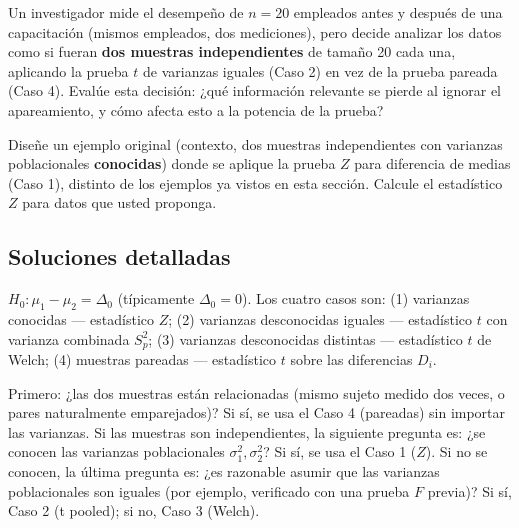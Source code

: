 \begin{problema}
	\label{prob:bf23a02}
	Un investigador mide el desempeño de $n=20$ empleados antes y después de una capacitación (mismos empleados, dos mediciones), pero decide analizar los datos como si fueran \textbf{dos muestras independientes} de tamaño 20 cada una, aplicando la prueba $t$ de varianzas iguales (Caso 2) en vez de la prueba pareada (Caso 4). Evalúe esta decisión: ¿qué información relevante se pierde al ignorar el apareamiento, y cómo afecta esto a la potencia de la prueba?
\end{problema}

\begin{problema}
	\label{prob:7fe0aa3}
	Diseñe un ejemplo original (contexto, dos muestras independientes con varianzas poblacionales \textbf{conocidas}) donde se aplique la prueba $Z$ para diferencia de medias (Caso 1), distinto de los ejemplos ya vistos en esta sección. Calcule el estadístico $Z$ para datos que usted proponga.
\end{problema}

\subsection*{Soluciones detalladas}

\begin{solproblema}[prob:16e7075]
	$H_0:\mu_1-\mu_2=\Delta_0$ (típicamente $\Delta_0=0$). Los cuatro casos son: (1) varianzas conocidas — estadístico $Z$; (2) varianzas desconocidas iguales — estadístico $t$ con varianza combinada $S_p^2$; (3) varianzas desconocidas distintas — estadístico $t$ de Welch; (4) muestras pareadas — estadístico $t$ sobre las diferencias $D_i$.
\end{solproblema}

\begin{solproblema}[prob:b9ad2de]
	Primero: ¿las dos muestras están relacionadas (mismo sujeto medido dos veces, o pares naturalmente emparejados)? Si sí, se usa el Caso 4 (pareadas) sin importar las varianzas. Si las muestras son independientes, la siguiente pregunta es: ¿se conocen las varianzas poblacionales $\sigma_1^2,\sigma_2^2$? Si sí, se usa el Caso 1 ($Z$). Si no se conocen, la última pregunta es: ¿es razonable asumir que las varianzas poblacionales son iguales (por ejemplo, verificado con una prueba $F$ previa)? Si sí, Caso 2 (t pooled); si no, Caso 3 (Welch).
\end{solproblema}

